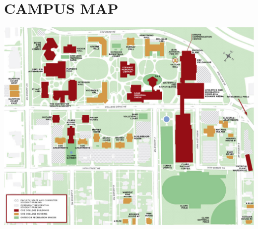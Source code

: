 \documentclass[
  letterpaper,
]{scrbook}
\begin{document}
\chapter{CAMPUS MAP}\label{sec-campus-map}

\begin{center}
\includegraphics{catalog_sections/graphics/Campus-Map_full-screen.jpg}
\end{center}

\backmatter
\printindex
\end{document}
